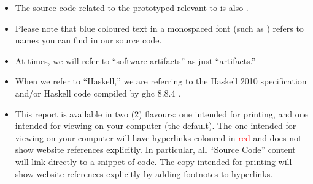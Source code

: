 \begin{itemize}
            \sourceCodeBlobHashesTable{}

      \item The source code related to the prototyped \ChunkDB{} relevant to
             is also .

      \item Please note that blue coloured text in a monospaced font (such as
            \ExampleText{}) refers to names you can find in our source code.

      \item At times, we will refer to ``software artifacts'' as just
            ``artifacts.''

      \item When we refer to ``Haskell,'' we are referring to the Haskell 2010
            specification \cite{Haskell2010} and/or Haskell code compiled by
            \acs{ghc} 8.8.4 \cite{GHC884}.

      \item This report is available in two (2) flavours: one intended for
            printing, and one intended for viewing on your computer (the
            default). The one intended for viewing on your computer will have
            hyperlinks coloured in \textcolor{red}{red} and does not show
            website references explicitly. In particular, all ``Source Code''
            content will link directly to a snippet of code. The copy intended
            for printing will show website references explicitly by adding
            footnotes to hyperlinks.

\end{itemize}
